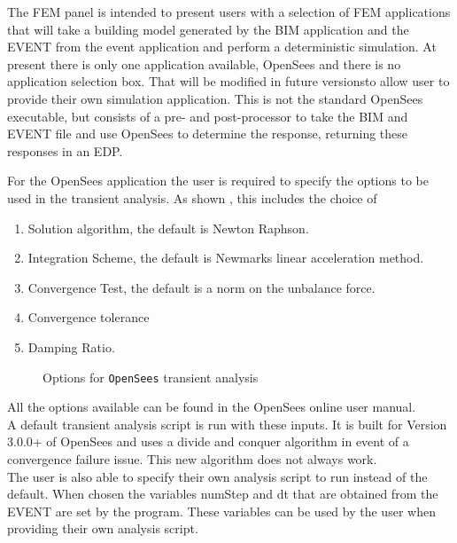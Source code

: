 The FEM panel is intended to present users with a selection of FEM
applications that will take a building model generated by the BIM
application and the EVENT from the event application and perform a
deterministic simulation.  At present there is only one application
available, OpenSees and there is no application selection box.  That
will be modified in future versionsto allow user to provide their own
simulation application.  This is not the standard OpenSees executable,
but consists of a pre- and post-processor to take the BIM and EVENT
file and use OpenSees to determine the response, returning these
responses in an EDP.

For the OpenSees application the user is required to specify the
options to be used in the transient analysis. As shown ,
this includes the choice of
\begin{enumerate}
\item Solution algorithm, the default is Newton Raphson.
\item Integration Scheme, the default is Newmarks linear acceleration
  method.
\item Convergence Test, the default is a norm on the unbalance force.
\item Convergence tolerance
\item Damping Ratio.
\end{enumerate}

\begin{figure}[!htbp]
  \caption{Options for \texttt{OpenSees} transient analysis}
  \label{fig:fem}
\end{figure}

All the options available can be found in the OpenSees online user
manual.\\

A default transient analysis script is run with these inputs. It is
built for Version 3.0.0+ of OpenSees and uses a divide and conquer
algorithm in event of a convergence failure issue. This new algorithm
does not always work. \\

The user is also able to specify their own analysis script to run
instead of the default. When chosen the variables numStep and dt that
are obtained from the EVENT are set by the program. These variables
can be used by the user when providing their own analysis script.
